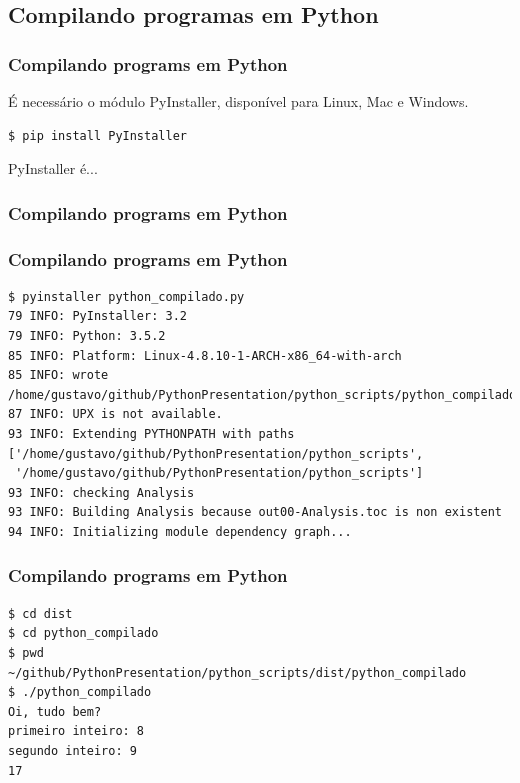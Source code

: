 \documentclass[aspectratio=169]{beamer}
\begin{document}
\subsection{Compilando programas em Python}

\begin{frame}[fragile]
	\frametitle{Compilando programs em Python}
	É necessário o módulo PyInstaller, disponível para Linux, Mac e Windows.

	\begin{lstlisting}
$ pip install PyInstaller
	\end{lstlisting}

	PyInstaller é...
\end{frame}

\begin{frame}[fragile]
	\frametitle{Compilando programs em Python}
	
\end{frame}

\begin{frame}[fragile]
	\frametitle{Compilando programs em Python}

	\begin{lstlisting}
$ pyinstaller python_compilado.py
79 INFO: PyInstaller: 3.2
79 INFO: Python: 3.5.2
85 INFO: Platform: Linux-4.8.10-1-ARCH-x86_64-with-arch
85 INFO: wrote /home/gustavo/github/PythonPresentation/python_scripts/python_compilado.spec
87 INFO: UPX is not available.
93 INFO: Extending PYTHONPATH with paths
['/home/gustavo/github/PythonPresentation/python_scripts',
 '/home/gustavo/github/PythonPresentation/python_scripts']
93 INFO: checking Analysis
93 INFO: Building Analysis because out00-Analysis.toc is non existent
94 INFO: Initializing module dependency graph...
	\end{lstlisting}
\end{frame}

\begin{frame}[fragile]
	\frametitle{Compilando programs em Python}

	\begin{lstlisting}
$ cd dist
$ cd python_compilado
$ pwd
~/github/PythonPresentation/python_scripts/dist/python_compilado
$ ./python_compilado
Oi, tudo bem?
primeiro inteiro: 8
segundo inteiro: 9
17
	\end{lstlisting}
\end{frame}

\end{document}

